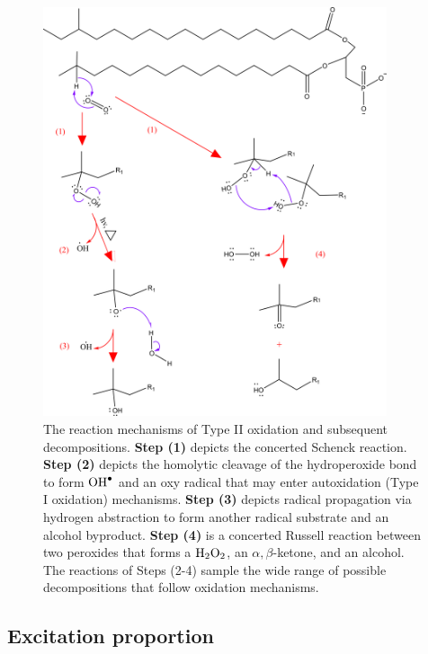 \begin{figure}
    \centering
    \includegraphics[width = 0.9\textwidth]{images/PDIpy/background/BCFA_schenck_oxidation_2.png}
    \caption{
         The reaction mechanisms of Type II oxidation and subsequent decompositions. \textbf{Step (1)} depicts the concerted \cite{Foote1968PhotosensitizedOxygen} Schenck reaction. \textbf{Step (2)} depicts the homolytic cleavage of the hydroperoxide bond to form $\ce{OH^.}$ and an oxy radical that may enter autoxidation (Type I oxidation) mechanisms. \textbf{Step (3)} depicts radical propagation via hydrogen abstraction to form another radical substrate and an alcohol byproduct. \textbf{Step (4)} is a concerted Russell reaction \cite{Russell1957Deuterium-isotopeRadicals,Howard1968TheMechanism} between two peroxides that forms a $\ce{H2O2}$, an $\alpha,\beta$-ketone, and an alcohol. The reactions of Steps (2-4) sample the wide range of possible decompositions that follow oxidation mechanisms.
    }
    \label{schenck_mechanism}
\end{figure}

\subsection{Excitation proportion} \label{excitation_proportion_estimate}

